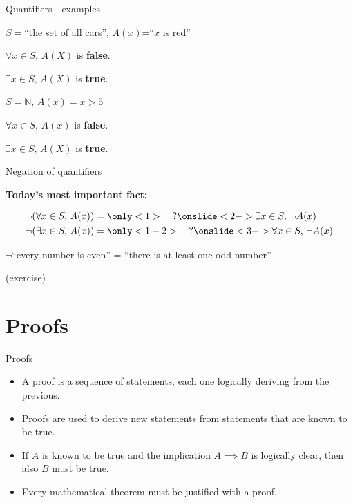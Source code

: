 \documentclass[11pt]{beamer}
\theoremstyle{definition}
\begin{document}
\begin{frame}{Quantifiers - examples}
  \begin{example}
  $S=$``the set of all cars'', $A(x)$=``$x$ is red''

  $\forall x\in S,\, A(X)$ is \textbf{false}.

  $\exists x\in S,\, A(X)$ is \textbf{true}.
  \end{example}
  \begin{example}
    $S=\mathbb{N}$, $A(x)=x>5$

  $\forall x\in S,\, A(x)$ is \textbf{false}.

  $\exists x\in S,\, A(X)$ is \textbf{true}.
  \end{example}
\end{frame}

\begin{frame}{Negation of quantifiers}
  \begin{center}
    \textbf{Today's most important fact:}
  \end{center}
  \begin{align*}
    \neg(\forall x\in S,\, A(x))&=\only<1>{\quad?}
    \onslide<2->{\exists x\in S,\,\neg A(x)}\\
    \neg(\exists x\in S,\, A(x))&=\only<1-2>{\quad?}
    \onslide<3->{\forall x\in S,\,\neg A(x)}\\
  \end{align*}
  \pause
  \begin{example}
    \begin{center}
  $\neg$``every number is even'' = ``there is at least one odd number''
    \end{center}
  \end{example}
\end{frame}

\begin{frame}
  (exercise)
\end{frame}

\section{Proofs}

\begin{frame}{Proofs}
  \begin{itemize}
    \item A proof is a sequence of statements, each one logically deriving from
          the previous.
          \pause
    \item Proofs are used to derive new statements from statements that are
          known to be true.
          \pause
    \item If $A$ is known to be true and the implication $A\implies B$ is
          logically clear, then also $B$ must be true.
          \pause
    \item Every mathematical theorem must be justified with a proof.
  \end{itemize}
\end{frame}
\end{document}
